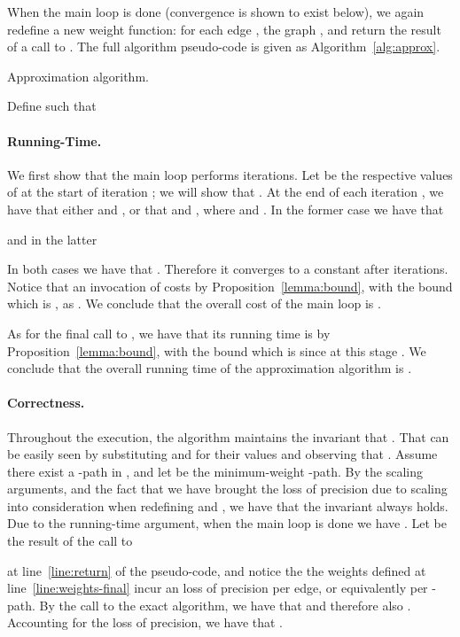 \documentclass{llncs}
\begin{document}
When the main loop is done (convergence is shown to exist below), we again redefine a new weight function:  for each edge , the graph , and return the result of a call to . The full algorithm pseudo-code is given as Algorithm~\ref{alg:approx}.


\begin{algorithm}[t]\label{alg:approx}
\caption{Approximation algorithm.}
\;
\;
  \;
Define  such that \;\label{line:weights-final}
\;
\Return{}\label{line:return}
\end{algorithm}


\paragraph{Running-Time.} 
We first show that the main loop performs  iterations. Let  be the respective values of  at the start of iteration ; we will show that . At the end of each iteration , we have that either  and , or that  and , where  and . In the former case we have that 

and in the latter

In both cases we have that . Therefore it converges to a constant after  iterations. Notice that an invocation of  costs  by Proposition~\ref{lemma:bound}, with the bound  which is , as . We conclude that the overall cost of the main loop is .

As for the final call to , we have that its running time is  by Proposition~\ref{lemma:bound}, with the bound  which is  since at this stage . We conclude that the overall running time of the approximation algorithm is .

\paragraph{Correctness.} 
Throughout the execution, the algorithm maintains the invariant that . That can be easily seen by substituting  and  for their values and observing that . 
Assume there exist a -path in , and let  be the minimum-weight -path. By the scaling arguments, and the fact that we have brought the loss of precision due to scaling into consideration when redefining  and , we have that the invariant  always holds. Due to the running-time argument, when the main loop is done we have . Let  be the result of the call to  
 
at line~\ref{line:return} of the pseudo-code, and notice the the weights defined at line~\ref{line:weights-final} incur an  loss of precision per edge, or equivalently  per -path. By the call to the exact algorithm, we have that  
and therefore also . Accounting for the loss of precision, we have that .
\end{document}
